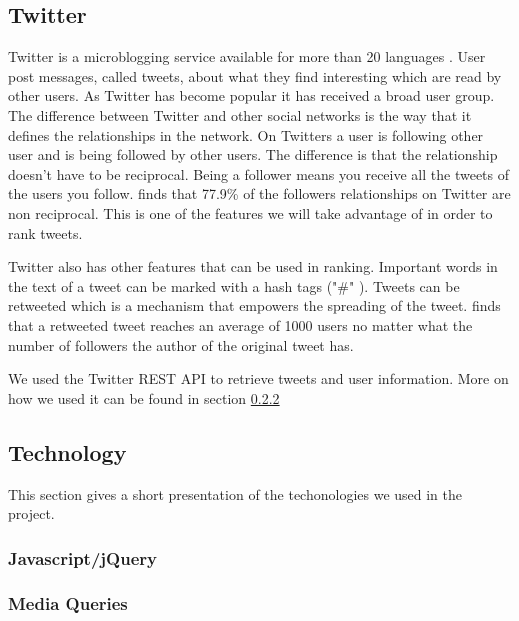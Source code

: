 \subsection{Twitter}
Twitter is a microblogging service available for more than 20 languages \citep{Twitter2012}. User post messages, called tweets, about what they find interesting which are read by other users. As Twitter has become popular it has received a broad user group. The difference between Twitter and other social networks is the way  that it defines the relationships in the network. On Twitters a user is following other user and is being followed by other users. The difference is that the relationship doesn't have to be reciprocal. Being a follower means you receive all the tweets of the users you follow. \citep{Kwak2010} finds that 77.9\% of the followers relationships on Twitter are non reciprocal. This is one of the features we will take advantage of in order to rank tweets. 

Twitter also has other features that can be used in ranking. Important words in the text of a tweet can be marked with a hash tags ("\#" ). Tweets can be retweeted which is a mechanism that empowers the spreading of the tweet. \citep{Kwak2010} finds that a retweeted tweet reaches an average of 1000 users no matter what the number of followers the author of the original tweet has. 

We used the Twitter REST API to retrieve tweets and user information. More on how we used it can be found in section \ref{} \nameref{} 

\subsection{Technology}
This section gives a short presentation of the techonologies we used in the project. 

\subsubsection{Javascript/jQuery} %
\subsubsection{Media Queries} %
